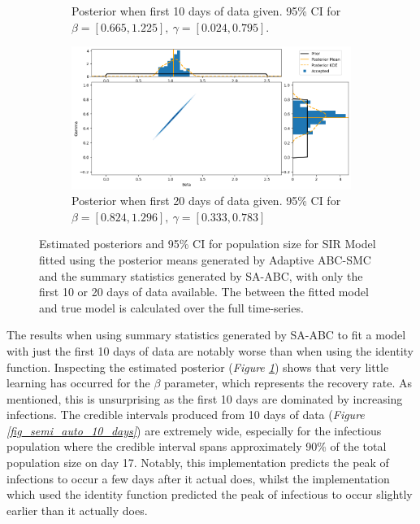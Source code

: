 \documentclass[11pt,a4paper]{article}
\theoremstyle{break}
\begin{document}
\begin{figure}[H]
{\begin{subfigure}{.45\paperwidth}
        \caption{Posterior when first 10 days of data given. 95\% CI for $\beta=[0.665,1.225],\ \gamma=[0.024,0.795]$.}
        \label{fig_semi_auto_10_days_posterior}
      \end{subfigure}
      \begin{subfigure}{.45\paperwidth}
        \centering
        \includegraphics[width=1\textwidth]{Semi_Auto_ABC_SMC_20_days_joint_posterior.png}
        \caption{Posterior when first 20 days of data given. 95\% CI for $\beta=[0.824,1.296],\ \gamma=[0.333,0.783]$}
        \label{fig_semi_auto_20_days_posterior}
      \end{subfigure}
    }
    \caption{Estimated posteriors and 95\% CI for population size for SIR Model fitted using the posterior means generated by Adaptive ABC-SMC and the summary statistics generated by SA-ABC, with only the first 10 or 20 days of data available. The between the fitted model and true model is calculated over the full time-series.}
    \label{fig_semi_auto_restricted_data}
  \end{figure}

  \par The results when using summary statistics generated by SA-ABC to fit a model with just the first 10 days of data are notably worse than when using the identity function. Inspecting the estimated posterior (\textit{Figure \ref{fig_semi_auto_10_days_posterior}}) shows that very little learning has occurred for the $\beta$ parameter, which represents the recovery rate. As mentioned, this is unsurprising as the first 10 days are dominated by increasing infections. The credible intervals produced from 10 days of data (\textit{Figure \ref{fig_semi_auto_10_days}}) are extremely wide, especially for the infectious population where the credible interval spans approximately 90\% of the total population size on day 17. Notably, this implementation predicts the peak of infections to occur a few days after it actual does, whilst the implementation which used the identity function predicted the peak of infectious to occur slightly earlier than it actually does.
\end{document}
